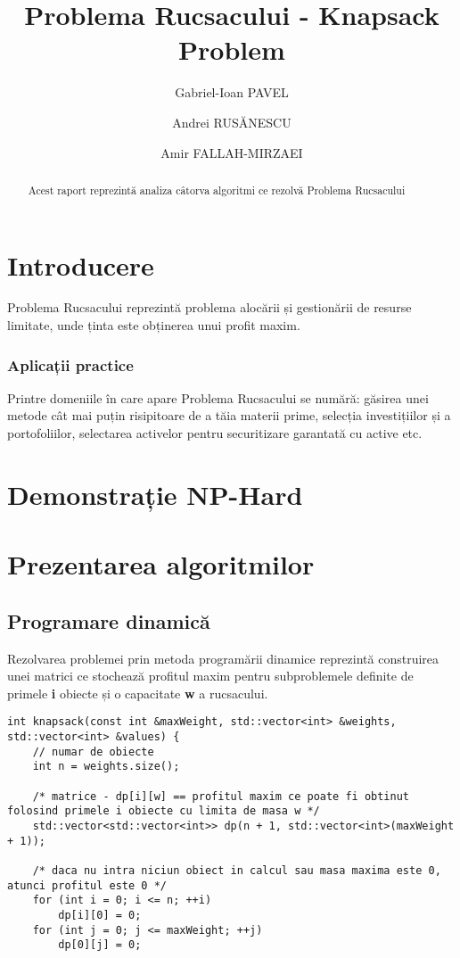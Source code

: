 \documentclass[runningheads]{llncs}
\begin{document}
%
\title{Problema Rucsacului - Knapsack Problem}
%
%
\author{Gabriel-Ioan PAVEL \and
Andrei RUSĂNESCU \and
Amir FALLAH-MIRZAEI}
%
%
\maketitle              %
%
\begin{abstract}
Acest raport reprezintă analiza câtorva algoritmi ce rezolvă Problema Rucsacului

\end{abstract}
%
%
%
\section{Introducere}
Problema Rucsacului reprezintă problema alocării și gestionării de resurse limitate,
unde ținta este obținerea unui profit maxim.

\subsubsection{Aplicații practice} Printre domeniile în care apare Problema
Rucsacului se numără: găsirea unei metode cât mai puțin risipitoare de a tăia
materii prime, selecția investițiilor și a portofoliilor, selectarea activelor
pentru securitizare garantată cu active etc.

\section{Demonstrație NP-Hard}

\section{Prezentarea algoritmilor}
\subsection{Programare dinamică}
Rezolvarea problemei prin metoda programării dinamice reprezintă construirea
unei matrici ce stochează profitul maxim pentru subproblemele definite de
primele \textbf{i} obiecte și o capacitate \textbf{w} a rucsacului.

\begin{lstlisting}
int knapsack(const int &maxWeight, std::vector<int> &weights, std::vector<int> &values) {
	// numar de obiecte
	int n = weights.size();

	/* matrice - dp[i][w] == profitul maxim ce poate fi obtinut folosind primele i obiecte cu limita de masa w */
	std::vector<std::vector<int>> dp(n + 1, std::vector<int>(maxWeight + 1));

	/* daca nu intra niciun obiect in calcul sau masa maxima este 0, atunci profitul este 0 */
	for (int i = 0; i <= n; ++i)
		dp[i][0] = 0;
	for (int j = 0; j <= maxWeight; ++j)
		dp[0][j] = 0;
\end{lstlisting}
\end{document}
